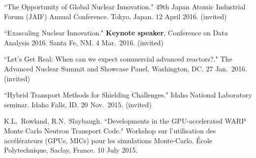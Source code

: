 \begin{bibsection}


\item ``The Opportunity of Global Nuclear Innovation." 49th Japan Atomic Industrial Forum (JAIF) Annual Conference. Tokyo, Japan. 12 April 2016. (invited)

\item ``Exascaling Nuclear Innovation." \textbf{Keynote speaker}, Conference on Data Analysis 2016. Santa Fe, NM. 4 Mar.\ 2016. (invited) 


\item ``Let’s Get Real: When can we expect commercial
advanced reactors?." The Advanced Nuclear Summit and Showcase Panel. Washington, DC. 27 Jan.\ 2016. (invited)

\item ``Hybrid Transport Methods for Shielding Challenges." Idaho National Laboratory seminar. Idaho Falls, ID. 20 Nov.\ 2015. (invited) 

\item K.L.\ Rowland, R.N.\ Slaybaugh. ``Developments in the GPU-accelerated WARP Monte Carlo Neutron Transport Code." Workshop sur l'utilisation des acc\'{e}l\'{e}rateurs (GPUs, MICs) pour les simulations Monte-Carlo. \'{E}cole Polytechnique, Saclay, France. 10 July 2015. 





\end{bibsection}
